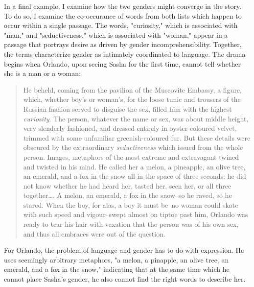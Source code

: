 \documentclass[11pt]{article}
\begin{document}
In a final example, I examine how the two genders might converge in
the story. To do so, I examine the co-occurance of words from both
lists which happen to occur within a single passage. The words,
"curiosity," which is associated with "man," and "seductiveness,"
which is associated with "woman," appear in a passage that portrays
desire as driven by gender incomprehensibility. Together, the terms
characterize gender as intimately coordinated to language. The drama
begins when Orlando, upon seeing Sasha for the first time, cannot tell
whether she is a man or a woman:
\begin{quote}
He beheld, coming from the pavilion of the Muscovite Embassy, a
figure, which, whether boy's or woman's, for the loose tunic and
trousers of the Russian fashion served to disguise the sex, filled him
with the highest \emph{curiosity}. The person, whatever the name or sex,
was about middle height, very slenderly fashioned, and dressed
entirely in oyster-coloured velvet, trimmed with some unfamiliar
greenish-coloured fur. But these details were obscured by the
extraordinary \emph{seductiveness} which issued from the whole
person. Images, metaphors of the most extreme and extravagant twined
and twisted in his mind. He called her a melon, a pineapple, an olive
tree, an emerald, and a fox in the snow all in the space of three
seconds; he did not know whether he had heard her, tasted her, seen
her, or all three together\ldots{}. A melon, an emerald, a fox in the
snow--so he raved, so he stared. When the boy, for alas, a boy it must
be--no woman could skate with such speed and vigour--swept almost on
tiptoe past him, Orlando was ready to tear his hair with vexation that
the person was of his own sex, and thus all embraces were out of the
question.
\end{quote}
For Orlando, the problem of language and gender has to do with
expression. He uses seemingly arbitrary metaphors, "a melon, a
pinapple, an olive tree, an emerald, and a fox in the snow,"
indicating that at the same time which he cannot place Sasha's gender,
he also cannot find the right words to describe her.
\end{document}
